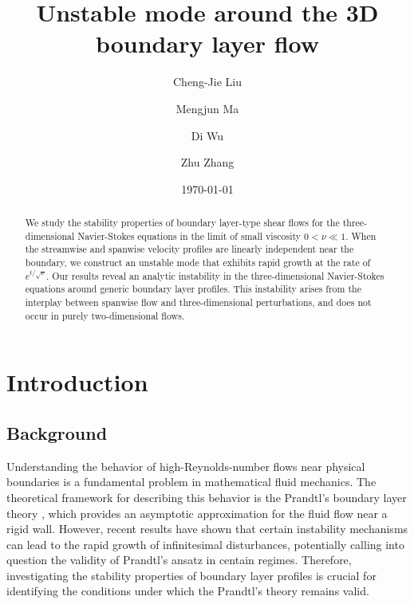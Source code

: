 \documentclass[reqno,11pt]{amsart}
\numberwithin{equation}{section}
\numberwithin{equation}{section}
\theoremstyle{plain}
\begin{document}
\date{\today}
\title
{Unstable mode around the 3D boundary layer flow}

\author[C.-J. Liu]{Cheng-Jie Liu}
\address[C.-J. Liu]{School of Mathematical Sciences, LSC-MOE, CMA-Shanghai and Institute of Natural Sciences, Shanghai Jiao Tong University, Shanghai, China}

\author[M. Ma]{Mengjun Ma}
\address[M. Ma]{School of Mathematics, Sun Yat-Sen University, 510275 Guangzhou, China}

\author{Di Wu}
\address[D. Wu]{School of Mathematics, South China University of Technology, Guangzhou, 510640,  P. R. China}

\author[Z. Zhang]{Zhu Zhang}
\address[Z. Zhang]{Department of Applied Mathematics, The Hong Kong Polytechnic University, Hong Kong}

\begin{abstract}
We study the stability properties of boundary layer-type shear flows for the three-dimensional Navier-Stokes equations in the limit of small viscosity $0<\nu\ll 1$. When the streamwise and spanwise velocity profiles are linearly independent near the boundary, we construct an unstable mode that exhibits rapid growth at the rate of $e^{t/\sqrt{\nu}}$. Our results reveal an analytic instability in the three-dimensional Navier-Stokes equations around generic boundary layer profiles. This instability arises from the interplay between spanwise flow and three-dimensional perturbations, and does not occur in purely two-dimensional flows.
\end{abstract}
\maketitle
\tableofcontents
\section{Introduction}

\subsection{Background}

Understanding the behavior of high-Reynolds-number flows near physical boundaries is a fundamental problem in mathematical fluid mechanics. The theoretical framework for describing this behavior is the Prandtl's boundary layer theory \cite{Prandtl-1904}, which provides an asymptotic approximation for the fluid flow near a rigid wall. However, recent results have shown that certain instability mechanisms can lead to the rapid growth of infinitesimal disturbances, potentially calling into question the validity of Prandtl's ansatz in centain regimes. Therefore, investigating the stability properties of boundary layer profiles is crucial for identifying the conditions under which the Prandtl's theory remains valid.\\
\end{document}
